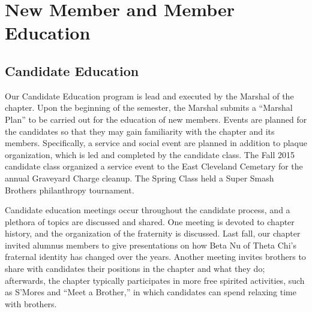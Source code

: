 \chapter{New Member and Member Education}

  \section*{Candidate Education}
    Our Candidate Education program is lead and executed by the Marshal of the chapter. Upon the beginning of the semester, the Marshal submits a ``Marshal Plan'' to be carried out for the education of new members. Events are planned for the candidates so that they may gain familiarity with the chapter and its members. Specifically, a service and social event are planned in addition to plaque organization, which is led and completed by the candidate class. The Fall 2015 candidate class organized a service event to the East Cleveland Cemetary for the annual Graveyard Charge cleanup. The Spring Class held a Super Smash Brothers philanthropy tournament.
  
    Candidate education meetings occur throughout the candidate process, and a plethora of topics are discussed and shared. One meeting is devoted to chapter history, and the organization of the fraternity is discussed. Last fall, our chapter invited alumnus members to give presentations on how Beta Nu of Theta Chi's fraternal identity has changed over the years. Another meeting invites brothers to share with candidates their positions in the chapter and what they do; afterwards, the chapter typically participates in more free spirited activities, such as S'Mores and ``Meet a Brother,'' in which candidates can spend relaxing time with brothers. 

